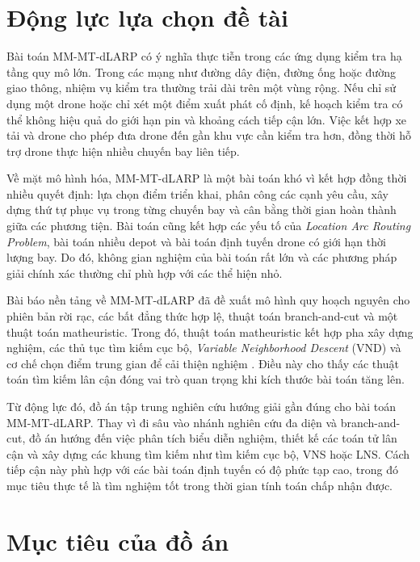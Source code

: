 \section{Động lực lựa chọn đề tài}

Bài toán MM-MT-dLARP có ý nghĩa thực tiễn trong các ứng dụng kiểm tra hạ tầng quy mô lớn. Trong các mạng như đường dây điện, đường ống hoặc đường giao thông, nhiệm vụ kiểm tra thường trải dài trên một vùng rộng. Nếu chỉ sử dụng một drone hoặc chỉ xét một điểm xuất phát cố định, kế hoạch kiểm tra có thể không hiệu quả do giới hạn pin và khoảng cách tiếp cận lớn. Việc kết hợp xe tải và drone cho phép đưa drone đến gần khu vực cần kiểm tra hơn, đồng thời hỗ trợ drone thực hiện nhiều chuyến bay liên tiếp.

Về mặt mô hình hóa, MM-MT-dLARP là một bài toán khó vì kết hợp đồng thời nhiều quyết định: lựa chọn điểm triển khai, phân công các cạnh yêu cầu, xây dựng thứ tự phục vụ trong từng chuyến bay và cân bằng thời gian hoàn thành giữa các phương tiện. Bài toán cũng kết hợp các yếu tố của \textit{Location Arc Routing Problem}, bài toán nhiều depot và bài toán định tuyến drone có giới hạn thời lượng bay. Do đó, không gian nghiệm của bài toán rất lớn và các phương pháp giải chính xác thường chỉ phù hợp với các thể hiện nhỏ.

Bài báo nền tảng về MM-MT-dLARP đã đề xuất mô hình quy hoạch nguyên cho phiên bản rời rạc, các bất đẳng thức hợp lệ, thuật toán branch-and-cut và một thuật toán matheuristic. Trong đó, thuật toán matheuristic kết hợp pha xây dựng nghiệm, các thủ tục tìm kiếm cục bộ, \textit{Variable Neighborhood Descent} (VND) và cơ chế chọn điểm trung gian để cải thiện nghiệm \cite{corberan2025mmdlarp}. Điều này cho thấy các thuật toán tìm kiếm lân cận đóng vai trò quan trọng khi kích thước bài toán tăng lên.

Từ động lực đó, đồ án tập trung nghiên cứu hướng giải gần đúng cho bài toán MM-MT-dLARP. Thay vì đi sâu vào nhánh nghiên cứu đa diện và branch-and-cut, đồ án hướng đến việc phân tích biểu diễn nghiệm, thiết kế các toán tử lân cận và xây dựng các khung tìm kiếm như tìm kiếm cục bộ, VNS hoặc LNS. Cách tiếp cận này phù hợp với các bài toán định tuyến có độ phức tạp cao, trong đó mục tiêu thực tế là tìm nghiệm tốt trong thời gian tính toán chấp nhận được.

\section{Mục tiêu của đồ án}

